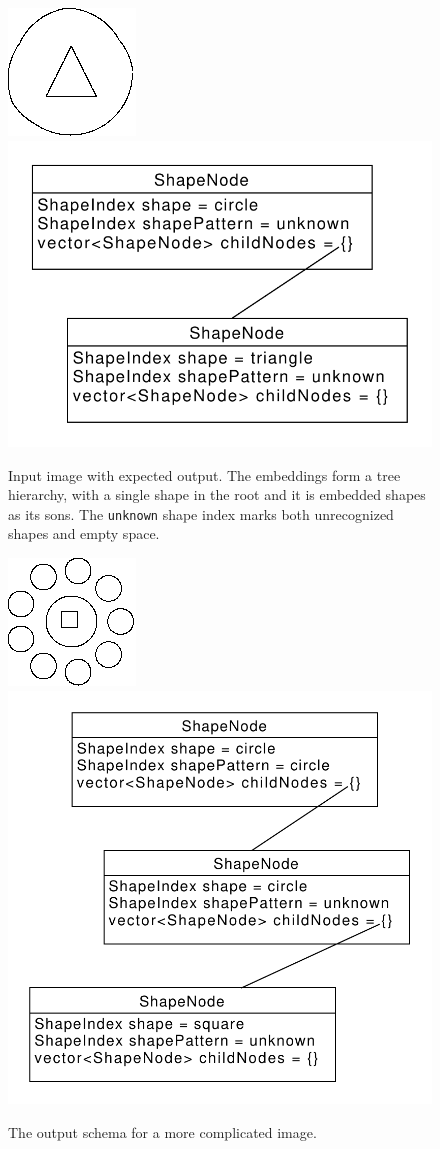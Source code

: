 \begin{description}
\begin{figure}[p]
\centering
\includegraphics[width=.3\linewidth]{ext/images/example_output0.png}
\quad
\includegraphics[width=.3\linewidth]{ext/images/example_output0.pdf}
\caption{Input image with expected output. The embeddings form a tree hierarchy, with a single shape in the root and it is embedded shapes as its sons. The \texttt{unknown} shape index marks both unrecognized shapes and empty space.}
\label{fig:output0}
\end{figure}

\begin{figure}[p]
\centering
\includegraphics[width=.3\linewidth]{ext/images/example_output1.png}
\quad
\includegraphics[width=.3\linewidth]{ext/images/example_output1.pdf}
\caption{The output schema for a more complicated image. }
\label{fig:output1}
\end{figure}


\end{description}

